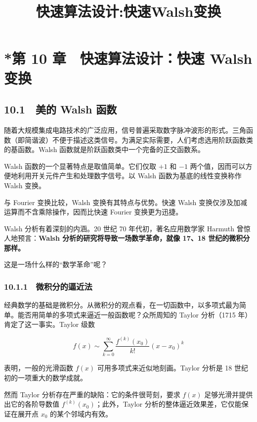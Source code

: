 \documentclass[
  10pt,
  fontset=fandol]{ctexart}
\title{快速算法设计:快速Walsh变换}
\author{}
\date{}
\begin{document}
\maketitle

\section{*第 10 章　快速算法设计：快速 Walsh 变换}\label{ux7b2c-10-ux7ae0-ux5febux901fux7b97ux6cd5ux8bbeux8ba1ux5febux901f-walsh-ux53d8ux6362}

\subsection{10.1　美的 Walsh 函数}\label{ux7f8eux7684-walsh-ux51fdux6570}

随着大规模集成电路技术的广泛应用，信号普遍采取数字脉冲波形的形式。三角函数（即简谐波）不便于描述这类信号。为满足实际需要，人们考虑选用阶跃函数类的基函数。Walsh 函数就是阶跃函数类中一个完备的正交函数系。

Walsh 函数的一个显著特点是取值简单。它们仅取 \(+1\) 和 \(-1\) 两个值，因而可以方便地利用开关元件产生和处理数字信号。以 Walsh 函数为基底的线性变换称作 Walsh 变换。

与 Fourier 变换比较，Walsh 变换有其特点与优势。快速 Walsh 变换仅涉及加减运算而不含乘除操作，因而比快速 Fourier 变换更为迅捷。

Walsh 分析有着深刻的内涵。20 世纪 70 年代初，著名应用数学家 Harmuth 曾惊人地预言：\textbf{Walsh 分析的研究将导致一场数学革命，就像 17、18 世纪的微积分那样。}

这是一场什么样的``数学革命''呢？

\subsubsection{10.1.1　微积分的逼近法}\label{ux5faeux79efux5206ux7684ux903cux8fd1ux6cd5}

经典数学的基础是微积分。从微积分的观点看，在一切函数中，以多项式最为简单。能否用简单的多项式来逼近一般函数呢？众所周知的 Taylor 分析（1715 年）肯定了这一事实。Taylor 级数

\[
f(x)\sim\sum_{k=0}^{\infty}\frac{f^{(k)}(x_0)}{k!}(x-x_0)^k
\]

表明，一般的光滑函数 \(f(x)\) 可用多项式来近似地刻画。Taylor 分析是 18 世纪初的一项重大的数学成就。

然而 Taylor 分析存在严重的缺陷：它的条件很苛刻，要求 \(f(x)\) 足够光滑并提供出它的各阶导数值 \(f^{(k)}(x_0)\)；此外，Taylor 分析的整体逼近效果差，它仅能保证在展开点 \(x_0\) 的某个邻域内有效。
\end{document}
